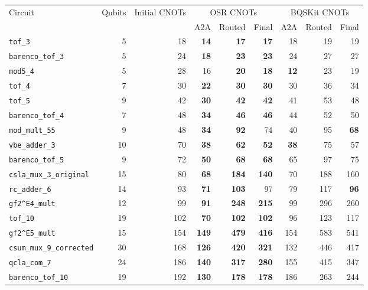 \begin{table}[p]
\centering
\scriptsize
\begin{tabular}{lrr|rrr|rrr}
\hline
Circuit & Qubits & Initial CNOTs & \multicolumn{3}{c|}{OSR CNOTs} & \multicolumn{3}{c}{BQSKit CNOTs} \\
 & & & A2A & Routed & Final & A2A & Routed & Final \\
\hline
\texttt{tof\_3} & 5 & 18 & \textbf{14} & \textbf{17} & \textbf{17} & 18 & 19 & 19 \\
\texttt{barenco\_tof\_3} & 5 & 24 & \textbf{18} & \textbf{23} & \textbf{23} & 24 & 27 & 27 \\
\texttt{mod5\_4} & 5 & 28 & 16 & \textbf{20} & \textbf{18} & \textbf{12} & 23 & 19 \\
\texttt{tof\_4} & 7 & 30 & \textbf{22} & \textbf{30} & \textbf{30} & 30 & 36 & 34 \\
\texttt{tof\_5} & 9 & 42 & \textbf{30} & \textbf{42} & \textbf{42} & 41 & 53 & 48 \\
\texttt{barenco\_tof\_4} & 7 & 48 & \textbf{34} & \textbf{46} & \textbf{46} & 44 & 52 & 50 \\
\texttt{mod\_mult\_55} & 9 & 48 & \textbf{34} & \textbf{92} & 74 & 40 & 95 & \textbf{68} \\
\texttt{vbe\_adder\_3} & 10 & 70 & \textbf{38} & \textbf{62} & \textbf{52} & \textbf{38} & 75 & 57 \\
\texttt{barenco\_tof\_5} & 9 & 72 & \textbf{50} & \textbf{68} & \textbf{68} & 65 & 97 & 75 \\
\texttt{csla\_mux\_3\_original} & 15 & 80 & \textbf{68} & \textbf{184} & \textbf{140} & 70 & 188 & 160 \\
\texttt{rc\_adder\_6} & 14 & 93 & \textbf{71} & \textbf{103} & 97 & 79 & 117 & \textbf{96} \\
\texttt{gf2\textasciicircum{}E4\_mult} & 12 & 99 & \textbf{91} & \textbf{248} & \textbf{215} & 99 & 296 & 260 \\
\texttt{tof\_10} & 19 & 102 & \textbf{70} & \textbf{102} & \textbf{102} & 96 & 123 & 117 \\
\texttt{gf2\textasciicircum{}E5\_mult} & 15 & 154 & \textbf{149} & \textbf{479} & \textbf{416} & 154 & 583 & 541 \\
\texttt{csum\_mux\_9\_corrected} & 30 & 168 & \textbf{126} & \textbf{420} & \textbf{321} & 132 & 446 & 417 \\
\texttt{qcla\_com\_7} & 24 & 186 & \textbf{140} & \textbf{317} & \textbf{280} & 155 & 415 & 347 \\
\texttt{barenco\_tof\_10} & 19 & 192 & \textbf{130} & \textbf{178} & \textbf{178} & 186 & 263 & 244 \\

\end{tabular}
\end{table}

